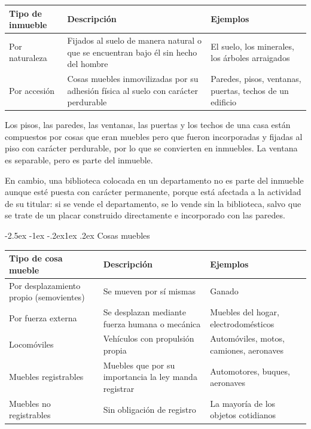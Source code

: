 \documentclass[12pt,oneside]{book}
\makeatletter
\renewcommand\subsection{\@startsection{subsection}{2}{\z@}%
  {-2.5ex \@plus -1ex \@minus -.2ex}{1ex \@plus .2ex}%
  {\normalfont\normalsize\bfseries}}
\newenvironment{tabla}{%
    \par\medskip\begingroup\small\renewcommand{\arraystretch}{1.3}\noindent\ignorespaces
}{%
    \par\endgroup\medskip
}
\makeatother
\begin{document}
\begin{tabla}
\begin{tabularx}{\textwidth}{B{2.8cm}YY}
\toprule
Tipo de inmueble & \textbf{Descripción} & \textbf{Ejemplos} \\
\midrule
Por naturaleza & Fijados al suelo de manera natural o que se encuentran bajo él sin hecho del hombre & El suelo, los minerales, los árboles arraigados \\
Por accesión & Cosas muebles inmovilizadas por su adhesión física al suelo con carácter perdurable & Paredes, pisos, ventanas, puertas, techos de un edificio \\
\bottomrule
\end{tabularx}
\end{tabla}

\begin{ejemplo}
Los pisos, las paredes, las ventanas, las puertas y los techos de una casa están compuestos por cosas que eran muebles pero que fueron incorporadas y fijadas al piso con carácter perdurable, por lo que se convierten en inmuebles. La ventana es separable, pero es parte del inmueble.

En cambio, una biblioteca colocada en un departamento no es parte del inmueble aunque esté puesta con carácter permanente, porque está afectada a la actividad de su titular: si se vende el departamento, se lo vende sin la biblioteca, salvo que se trate de un placar construido directamente e incorporado con las paredes.
\end{ejemplo}

\subsection{Cosas muebles}

\begin{tabla}
\begin{tabularx}{\textwidth}{B{3.8cm}YY}
\toprule
Tipo de cosa mueble & \textbf{Descripción} & \textbf{Ejemplos} \\
\midrule
Por desplazamiento propio (semovientes) & Se mueven por sí mismas & Ganado \\
Por fuerza externa & Se desplazan mediante fuerza humana o mecánica & Muebles del hogar, electrodomésticos \\
Locomóviles & Vehículos con propulsión propia & Automóviles, motos, camiones, aeronaves \\
Muebles registrables & Muebles que por su importancia la ley manda registrar & Automotores, buques, aeronaves \\
Muebles no registrables & Sin obligación de registro & La mayoría de los objetos cotidianos \\
\bottomrule
\end{tabularx}
\end{tabla}
\end{document}
